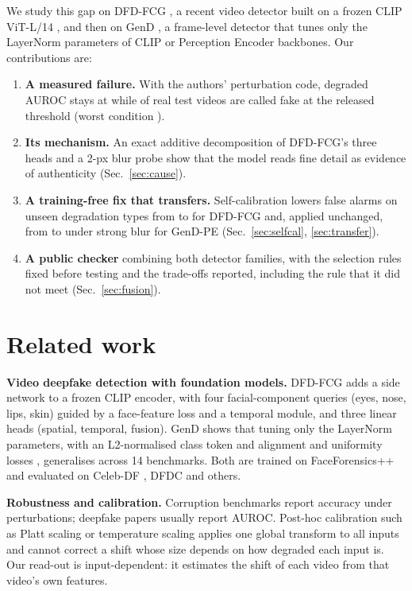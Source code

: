 \documentclass[11pt]{article}
\begin{document}
We study this gap on DFD-FCG \cite{han2025dfdfcg}, a recent video detector built on a frozen CLIP ViT-L/14
\cite{radford2021clip}, and then on GenD \cite{yermakov2026gend}, a frame-level detector that tunes only the
LayerNorm parameters of CLIP or Perception Encoder \cite{bolya2025pe} backbones. Our contributions are:
\begin{enumerate}
  \item \textbf{A measured failure.} With the authors' perturbation code, degraded AUROC stays at \OrigDegAuroc{} while
        \OrigFA{} of real test videos are called fake at the released threshold (worst condition \OrigWorstFA{}).
  \item \textbf{Its mechanism.} An exact additive decomposition of DFD-FCG's three heads and a 2-px blur probe show that
        the model reads fine detail as evidence of authenticity (Sec.~\ref{sec:cause}).
  \item \textbf{A training-free fix that transfers.} Self-calibration lowers false alarms on unseen degradation types
        from \OrigFA{} to \SCFA{} for DFD-FCG and, applied unchanged, from \PeRawFAFfppGBFive{} to \PeCalFAFfppGBFive{} under
        strong blur for GenD-PE (Sec.~\ref{sec:selfcal}, \ref{sec:transfer}).
  \item \textbf{A public checker} combining both detector families, with the selection rules fixed before testing and
        the trade-offs reported, including the rule that it did not meet (Sec.~\ref{sec:fusion}).
\end{enumerate}

\section{Related work}
\textbf{Video deepfake detection with foundation models.} DFD-FCG \cite{han2025dfdfcg} adds a side network to a frozen
CLIP encoder, with four facial-component queries (eyes, nose, lips, skin) guided by a face-feature loss and a temporal
module, and three linear heads (spatial, temporal, fusion). GenD \cite{yermakov2026gend} shows that tuning only the
LayerNorm parameters, with an L2-normalised class token and alignment and uniformity losses \cite{wang2020alignment},
generalises across 14 benchmarks. Both are trained on FaceForensics++ \cite{rossler2019ffpp} and evaluated on
Celeb-DF \cite{li2020celebdf}, DFDC \cite{dolhansky2020dfdc} and others.

\textbf{Robustness and calibration.} Corruption benchmarks \cite{hendrycks2019benchmarking} report accuracy under
perturbations; deepfake papers usually report AUROC. Post-hoc calibration such as Platt scaling
\cite{platt1999probabilistic} or temperature scaling \cite{guo2017calibration} applies one global transform to all
inputs and cannot correct a shift whose size depends on how degraded each input is. Our read-out is input-dependent:
it estimates the shift of each video from that video's own features.
\end{document}
